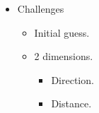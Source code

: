 \documentclass{beamer}
\begin{document}
\begin{frame}
\begin{columns}
\begin{itemize}
  \item Challenges
  \begin{itemize}
  \item Initial guess.
  \item 2 dimensions.
\begin{itemize}
  \item Direction.
  \item Distance.
\end{itemize}
  \end{itemize}
\end{itemize}
  \end{columns}
\end{frame}
\end{document}
